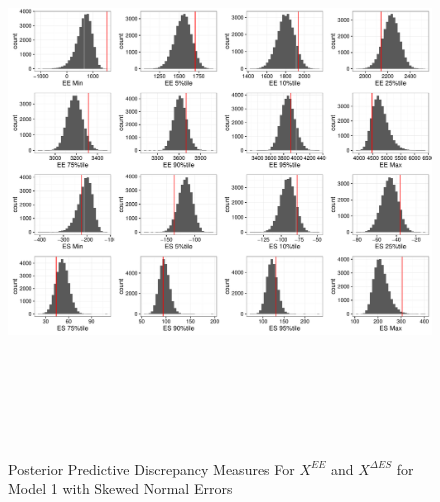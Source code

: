 \documentclass[11pt]{article}\usepackage[]{graphicx}\usepackage[]{color}
\begin{document}
 \begin{figure}
  \centering
  \includegraphics[width=17cm,height=15cm]{manual_figure/wpxdiag1s.pdf}
  \caption{Posterior Predictive Discrepancy Measures For $X^{EE}$ and $X^{\Delta ES}$ for Model 1 with Skewed Normal Errors}
  \label{wpxdiag1s}
  \end{figure}
\end{document}
